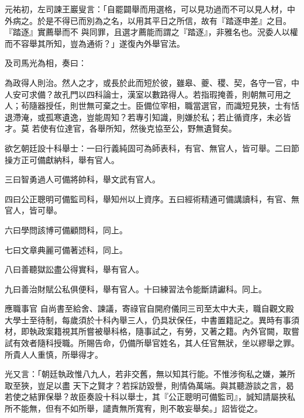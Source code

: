 \begin{pinyinscope}
 元祐初，左司諫王巖叟言：「自罷闢舉而用選格，可以見功過而不可以見人材，中外病之。於是不得已而別為之名，以用其平日之所信，故有『踏逐申差』之目。『踏逐』實薦舉而不
 與同罪，且選才薦能而謂之『踏逐』，非雅名也。況委人以權而不容舉其所知，豈為通術？」遂復內外舉官法。



 及司馬光為相，奏曰：



 為政得人則治。然人之才，或長於此而短於彼，雖皋、夔、稷、契，各守一官，中人安可求備？故孔門以四科論士，漢室以數路得人。若指瑕掩善，則朝無可用之人；茍隨器授任，則世無可棄之士。臣備位宰相，職當選官，而識短見狹，士有恬退滯淹，或孤寒遺逸，豈能周知？若專引知識，則嫌於私；若止循資序，未必皆才。莫
 若使有位達官，各舉所知，然後克協至公，野無遺賢矣。



 欲乞朝廷設十科舉士：一曰行義純固可為師表科，有官、無官人，皆可舉。二曰節操方正可備獻納科，舉有官人。



 三曰智勇過人可備將帥科，舉文武有官人。



 四曰公正聰明可備監司科，舉知州以上資序。五曰經術精通可備講讀科，有官、無官人，皆可舉。



 六曰學問該博可備顧問科，同上。



 七曰文章典麗可備著述科，同上。



 八曰善聽獄訟盡公得實科，舉有官人。



 九曰善治財賦公私俱便科，舉有官人。十曰練習法令能斷請讞科。同上。



 應職事官
 自尚書至給舍、諫議，寄祿官自開府儀同三司至太中大夫，職自觀文殿大學士至待制，每歲須於十科內舉三人，仍具狀保任，中書置籍記之。異時有事須材，即執政案籍視其所嘗被舉科格，隨事試之，有勞，又著之籍。內外官闕，取嘗試有效者隨科授職。所賜告命，仍備所舉官姓名，其人任官無狀，坐以繆舉之罪。所貴人人重慎，所舉得才。



 光又言：「朝廷執政惟八九人，若非交舊，無以知其行能。不惟涉徇私之嫌，兼所取至狹，豈足以盡
 天下之賢才？若採訪毀譽，則情偽萬端。與其聽游談之言，曷若使之結罪保舉？故臣奏設十科以舉士，其『公正聰明可備監司』，誠知請屬挾私所不能無，但有不如所舉，譴責無所寬宥，則不敢妄舉矣。」詔皆從之。




\end{pinyinscope}
